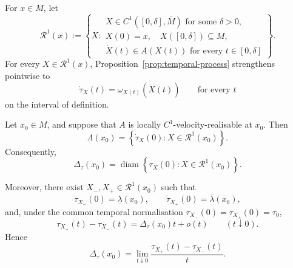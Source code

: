 \documentclass[graybox,natbib]{SNmult}
\providecommand{\1}{}
\renewcommand{\1}{\mathbbm 1}
\begin{document}
For \(x\in M\), let
\[
\mathcal R^1(x)
:=
\left\{
X:
\begin{array}{l}
X\in C^1([0,\delta],\overline M)
\text{ for some }\delta>0,\\
X(0)=x,\quad X([0,\delta])\subseteq M,\\
\dot X(t)\in A(X(t))
\text{ for every }t\in[0,\delta]
\end{array}
\right\}.
\]
For every \(X\in\mathcal R^1(x)\),
Proposition~\ref{prop:temporal-process} strengthens pointwise to
\[
\dot\tau_X(t)
=
\omega_{X(t)}\!\left(\dot X(t)\right)
\qquad
\text{for every }t
\]
on the interval of definition.

\begin{theorem}
\label{thm:dispersion}

Let \(x_0\in M\), and suppose that \(A\) is locally
\(C^1\)-velocity-realisable at \(x_0\). Then
\begin{equation}
\Lambda(x_0)
=
\left\{
\dot\tau_X(0):
X\in\mathcal R^1(x_0)
\right\}.
\label{eq:representation-spectrum}
\end{equation}
Consequently,
\begin{equation}
\Delta_\tau(x_0)
=
\operatorname{diam}
\left\{
\dot\tau_X(0):
X\in\mathcal R^1(x_0)
\right\}.
\label{eq:representation-dispersion}
\end{equation}

Moreover, there exist
\(X_-,X_+\in\mathcal R^1(x_0)\) such that
\[
\dot\tau_{X_-}(0)
=
\underline\lambda(x_0),
\qquad
\dot\tau_{X_+}(0)
=
\overline\lambda(x_0),
\]
and, under the common temporal normalisation
\(\tau_{X_-}(0)=\tau_{X_+}(0)=\tau_0\),
\begin{equation}
\tau_{X_+}(t)-\tau_{X_-}(t)
=
\Delta_\tau(x_0)t+o(t)
\qquad
(t\downarrow0).
\label{eq:dispersion-expansion}
\end{equation}
Hence
\[
\Delta_\tau(x_0)
=
\lim_{t\downarrow0}
\frac{
\tau_{X_+}(t)-\tau_{X_-}(t)
}{t}.
\]
\end{theorem}
\end{document}
